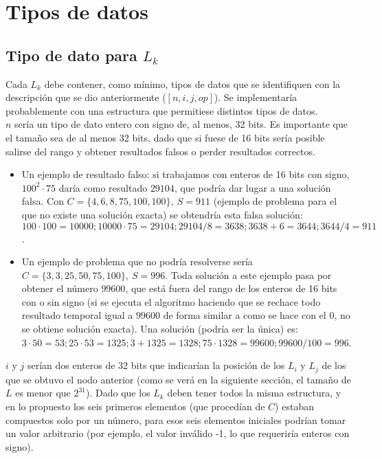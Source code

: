 \section{Tipos de datos}
\subsection{Tipo de dato para $L_k$}

Cada $L_k$ debe contener, como mínimo, tipos de datos que se identifiquen con la
 descripción que se dio anteriormente ($[n, i, j, op]$). Se implementaría
 probablemente con una estructura que permitiese distintos tipos de datos.\\

$n$ sería un tipo de dato entero con signo de, al menos, 32 bits. Es importante
que el tamaño sea de al menos 32 bits, dado que si fuese de 16 bits sería posible
 salirse del rango y obtener resultados falsos o perder resultados correctos.
\begin{itemize}
	\item Un ejemplo de resultado falso: si trabajamos con enteros de 16 bits con
	signo, $100^2 \cdot 75$ daría como resultado $29104$, que podría dar lugar a
	una solución falsa. Con $C=\{4, 6, 8, 75, 100, 100\},\ S = 911$ (ejemplo de
	problema para el que no existe una solución exacta) se obtendría esta falsa
	solución: $100 \cdot 100=10000; 10000 \cdot 75=29104;29104/8=3638;3638+6=3644;3644/4=911$.
	\item Un ejemplo de problema que no podría resolverse sería
	$C=\{3, 3, 25, 50, 75, 100\},\ S = 996$. Toda solución a este ejemplo pasa por
	obtener el número $99600$, que está fuera del rango de los enteros de 16 bits
	con o sin signo (si se ejecuta el algoritmo haciendo que se rechace todo
	resultado temporal igual a $99600$ de forma similar a como se hace con el
	$0$, no se obtiene solución exacta). Una solución (podría ser la única) es:
	$3 \cdot 50 = 53; 25 \cdot 53 = 1325; 3+1325=1328; 75 \cdot 1328 = 99600; 99600/100=996$.
\end{itemize}

$i$ y $j$ serían dos enteros de 32 bits que indicarían la posición de los $L_i$
y $L_j$ de los que se obtuvo el nodo anterior (como se verá en la siguiente sección, el tamaño de $L$ es menor que $2^{31}$). Dado que los $L_k$ deben tener
todos la misma estructura, y en lo propuesto los seis primeros elementos (que
procedían de $C$) estaban compuestos solo por un número, para esos seis
elementos iniciales podrían tomar un valor arbitrario (por ejemplo, el valor
inválido -1, lo que requeriría enteros con signo). \\

